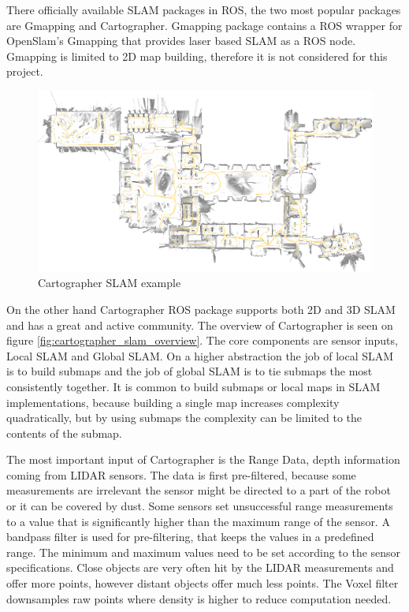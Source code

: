 There officially available SLAM packages in ROS, the two most popular packages are Gmapping and Cartographer.
Gmapping package contains a ROS wrapper for OpenSlam's Gmapping that provides laser based SLAM as a ROS node. 
Gmapping is limited to 2D map building, therefore it is not considered for this project.

\begin{figure}[!ht]
    \centering
	\includegraphics[width=140mm, keepaspectratio]{figures/cartographer_example.png}
    \caption{Cartographer SLAM example\cite{CartographerDocumentation}}
    \label{fig:cartographer_slam_example}
\end{figure}


On the other hand Cartographer ROS package supports both 2D and 3D SLAM and has a great and active community.
The overview of Cartographer is seen on figure \ref{fig:cartographer_slam_overview}. The core components are
sensor inputs, Local SLAM and Global SLAM. On a higher abstraction the job of local SLAM is to build submaps
and the job of global SLAM is to tie submaps the most consistently together.
It is common to build submaps or local maps in SLAM implementations, because building a single map increases 
complexity quadratically, but by using submaps the complexity can be limited to the contents of the submap.

The most important input of Cartographer is the Range Data, depth information coming from LIDAR sensors. 
The data is first pre-filtered, because some measurements are irrelevant the sensor might be directed to
a part of the robot or it can be covered by dust. Some sensors set unsuccessful range measurements to a value
that is significantly higher than the maximum range of the sensor. A bandpass filter is used for pre-filtering,
that keeps the values in a predefined range. The minimum and maximum values need to be set according to 
the sensor specifications. Close objects are very often hit by the LIDAR
measurements and offer more points, however distant objects offer much less points. The Voxel filter 
downsamples raw points where density is higher to reduce computation needed.


